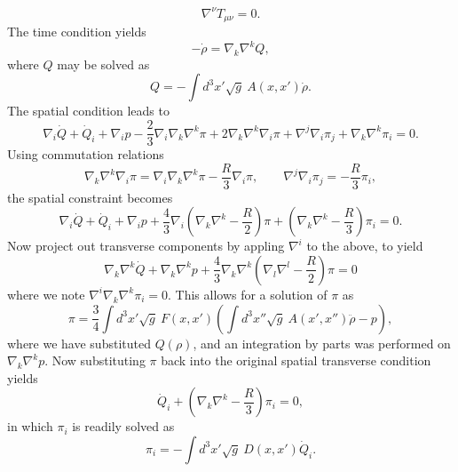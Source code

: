 \documentclass[10pt,letterpaper]{article}
\numberwithin{equation}{subsection}
\begin{document}
\begin{equation}
\nabla^\nu T_{\mu\nu} = 0.
\end{equation}
The time condition yields
\begin{equation}
-\dot\rho = \nabla_k \nabla^k Q,
\end{equation}
where $Q$ may be solved as
\begin{equation}
Q = -\int d^3x' \sqrt{g}\ A(x,x') \dot \rho.
\end{equation}
The spatial condition leads to
\begin{equation}
\nabla_i \dot Q + \dot Q_i +\nabla_i p - \frac{2}{3} \nabla_i \nabla_k \nabla^k \pi + 2\nabla_k \nabla^k \nabla_i \pi + \nabla^j \nabla_i \pi_j + \nabla_k \nabla^k \pi_i =0.
\end{equation}
Using commutation relations
\begin{equation}
\nabla_k \nabla^k \nabla_i \pi = \nabla_i \nabla_k\nabla^k \pi - \frac{R}{3}\nabla_i \pi,
\qquad \nabla^j \nabla_i \pi_j = - \frac{R}{3} \pi_i,
\end{equation}
the spatial constraint becomes
\begin{equation}
\nabla_i \dot Q + \dot Q_i + \nabla_i p + \frac{4}{3}\nabla_i\left( \nabla_k \nabla^k  - \frac{R}{2}\right) \pi + \left(\nabla_k \nabla^k -\frac{R}{3}\right) \pi_i=0.
\end{equation}
Now project out transverse components by appling $\nabla^i$ to the above, to yield
\begin{equation}
\nabla_k \nabla^k \dot Q + \nabla_k \nabla^k p + \frac{4}{3}\nabla_k \nabla^k \left(  \nabla_l \nabla^l  - \frac{R}{2}\right) \pi  =0
\end{equation}
where we note $\nabla^i \nabla_k \nabla^k \pi_i = 0$. This allows for a solution of $\pi$ as
\begin{equation}
\pi = \frac{3}{4}  \int d^3x' \sqrt g \ F(x,x')\left(\int d^3x'' \sqrt g\ A(x',x'') \ddot \rho - p\right),
\end{equation}
where we have substituted $Q(\rho)$, and an integration by parts was performed on $\nabla_k\nabla^k p$. Now substituting $\pi$ back into the original
spatial transverse condition yields
\begin{equation}
\dot Q_i + \left(\nabla_k \nabla^k - \frac{R}{3}\right) \pi_i = 0,
\end{equation}
in which $\pi_i$ is readily solved as
\begin{equation}
\pi_i = - \int d^3x' \sqrt g\ D(x,x') \dot Q_i.
\end{equation}
\end{document}
